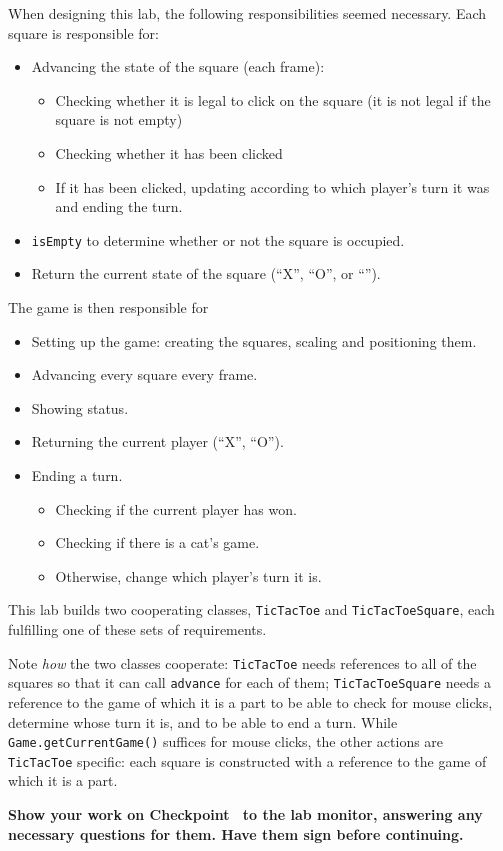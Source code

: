 \documentclass[12pt,oneside]{memoir}
\newcommand\code[1]{\lstinline^#1^}
\newenvironment{Checkpoint}[1]{%
  \begin{Exercise}[name={Checkpoint},title={#1}]}{%
  \end{Exercise}%
  \textbf{Show your work on Checkpoint~\theExercise{} to the lab monitor, %
    answering any necessary questions for them.  Have them sign before continuing.}}
\begin{document}
\newpage
\begin{Checkpoint}{Define classes}
  When designing this lab, the following responsibilities seemed
  necessary.  Each square is responsible for:
  \begin{itemize}
  \item Advancing the state of the square (each frame):
    \begin{itemize}
    \item Checking whether it is legal to click on the square (it is
      not legal if the square is not empty)
    \item Checking whether it has been clicked
    \item If it has been clicked, updating according to which player's
      turn it was and ending the turn.
    \end{itemize}
  \item \code{isEmpty} to determine whether or not the square is
    occupied.
  \item Return the current state of the square (``X'', ``O'', or ``'').
  \end{itemize}

  The game is then responsible for
  \begin{itemize}
  \item Setting up the game: creating the squares, scaling and
    positioning them.
  \item Advancing every square every frame.
  \item Showing status.
  \item Returning the current player (``X'', ``O'').
  \item Ending a turn.
    \begin{itemize}
    \item Checking if the current player has won.
    \item Checking if there is a cat's game.
    \item Otherwise, change which player's turn it is.
    \end{itemize}
  \end{itemize}

  This lab builds two cooperating classes, \code{TicTacToe} and
  \code{TicTacToeSquare}, each fulfilling one of these sets of
  requirements.

  Note \emph{how} the two classes cooperate: \code{TicTacToe} 
  needs references to all of the squares so that it can call
  \code{advance} for each of them; \code{TicTacToeSquare} needs a
  reference to the game of which it is a part to be able to check for
  mouse clicks, determine whose turn it is, and to be able to end a
  turn. While \code{Game.getCurrentGame()}  suffices for mouse clicks,
  the other actions are \code{TicTacToe} specific: each square is
  constructed with a reference to the game of which it is a part.


\end{Checkpoint}
\end{document}
